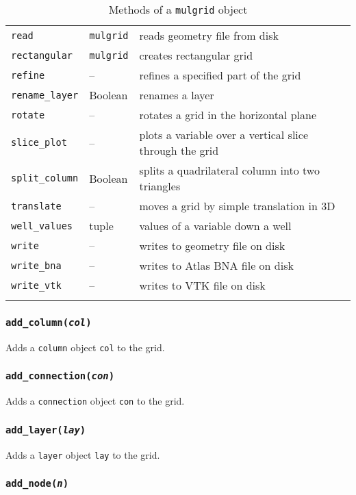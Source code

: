 \begin{center}
\begin{longtable}{|l|l|p{70mm}|}
  \texttt{read} & \texttt{mulgrid} & reads geometry file from disk\\
  \texttt{rectangular} & \texttt{mulgrid} & creates rectangular grid\\
  \texttt{refine} & -- & refines a specified part of the grid\\
  \texttt{rename\_layer} & Boolean & renames a layer\\
  \texttt{rotate} & -- & rotates a grid in the horizontal plane\\
  \texttt{slice\_plot} & -- & plots a variable over a vertical slice through the grid\\
  \texttt{split\_column} & Boolean & splits a quadrilateral column into two triangles\\ 
  \texttt{translate} & -- & moves a grid by simple translation in 3D\\
  \texttt{well\_values} & tuple & values of a variable down a well\\
  \texttt{write} & -- & writes to geometry file on disk\\
  \texttt{write\_bna} & -- & writes to Atlas BNA file on disk\\ 
  \texttt{write\_vtk} &  -- & writes to VTK file on disk\\
  \hline
  \caption{Methods of a \texttt{mulgrid} object}
  \label{tb:mulgrid_methods}
\end{longtable}
\end{center}

\subsubsection{\texttt{add\_column(\emph{col})}}

Adds a \texttt{column} object \texttt{col} to the grid.

\subsubsection{\texttt{add\_connection(\emph{con})}}

Adds a \texttt{connection} object \texttt{con} to the grid.

\subsubsection{\texttt{add\_layer(\emph{lay})}}

Adds a \texttt{layer} object \texttt{lay} to the grid.

\subsubsection{\texttt{add\_node(\emph{n})}}

